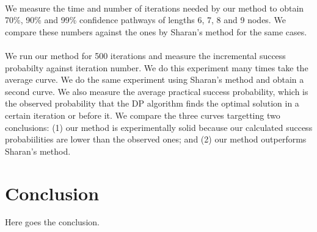 \documentclass{ws-procs11x85}
\begin{document}
\paragraph{}
We measure the time and number of iterations needed by our method to obtain
70\%, 90\% and 99\% confidence pathways of lengths 6, 7, 8 and 9 nodes. We
compare these numbers against the ones by Sharan's method for the same cases.

\paragraph{}
We run our method for 500 iterations and measure the incremental success
probabilty against iteration number. We do this experiment many times take the
average curve. We do the same experiment using Sharan's method and obtain a
second curve. We also measure the average practical success probability, which
is the observed probability that the DP algorithm finds the optimal solution in
a certain iteration or before it. We compare the three curves targetting two
conclusions: (1) our method is experimentally solid because our calculated
success probabiilities are lower than the observed ones; and (2) our method
outperforms Sharan's method.

\section{Conclusion}
Here goes the conclusion.




\end{document}
